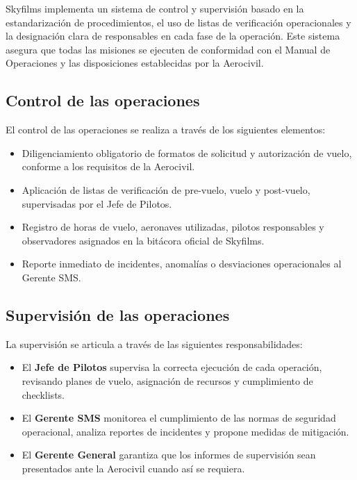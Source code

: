 Skyfilms implementa un sistema de control y supervisión basado en la estandarización de procedimientos, el uso de listas de verificación operacionales y la designación clara de responsables en cada fase de la operación. Este sistema asegura que todas las misiones se ejecuten de conformidad con el Manual de Operaciones y las disposiciones establecidas por la Aerocivil.

\subsection*{Control de las operaciones}
El control de las operaciones se realiza a través de los siguientes elementos:
\begin{itemize}
    \item Diligenciamiento obligatorio de formatos de solicitud y autorización de vuelo, conforme a los requisitos de la Aerocivil.
    \item Aplicación de listas de verificación de pre-vuelo, vuelo y post-vuelo, supervisadas por el Jefe de Pilotos.
    \item Registro de horas de vuelo, aeronaves utilizadas, pilotos responsables y observadores asignados en la bitácora oficial de Skyfilms.
    \item Reporte inmediato de incidentes, anomalías o desviaciones operacionales al Gerente SMS.
\end{itemize}

\subsection*{Supervisión de las operaciones}
La supervisión se articula a través de las siguientes responsabilidades:
\begin{itemize}
    \item El \textbf{Jefe de Pilotos} supervisa la correcta ejecución de cada operación, revisando planes de vuelo, asignación de recursos y cumplimiento de checklists.
    \item El \textbf{Gerente SMS} monitorea el cumplimiento de las normas de seguridad operacional, analiza reportes de incidentes y propone medidas de mitigación.
    \item El \textbf{Gerente General} garantiza que los informes de supervisión sean presentados ante la Aerocivil cuando así se requiera.
\end{itemize}

